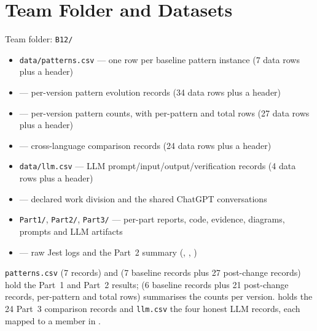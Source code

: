 \documentclass[11pt,a4paper]{article}
\begin{document}
\section{Team Folder and Datasets}
\begin{sloppypar}
Team folder: \texttt{B12/}
\begin{itemize}
  \item \texttt{data/patterns.csv} --- one row per baseline pattern instance
        (7 data rows plus a header)
  \item {} --- per-version pattern evolution
        records (34 data rows plus a header)
  \item {} --- per-version pattern counts, with
        per-pattern and total rows (27 data rows plus a header)
  \item {} --- cross-language comparison records
        (24 data rows plus a header)
  \item \texttt{data/llm.csv} --- LLM prompt/input/output/verification records
        (4 data rows plus a header)
  \item {} --- declared work division and the shared
        ChatGPT conversations
  \item \texttt{Part1/}, \texttt{Part2/}, \texttt{Part3/} --- per-part reports,
        code, evidence, diagrams, prompts and LLM artifacts
  \item {} --- raw Jest logs and the Part~2 summary
        (, ,
        )
\end{itemize}

\noindent\texttt{patterns.csv} (7 records) and 
(7 baseline records plus 27 post-change records) hold the Part~1 and Part~2
results;  (6 baseline records plus 21 post-change
records, per-pattern and total rows) summarises the counts per version.
 holds the 24 Part~3 comparison records and
\texttt{llm.csv} the four honest LLM records, each mapped to a member in
.
\end{sloppypar}
\end{document}
